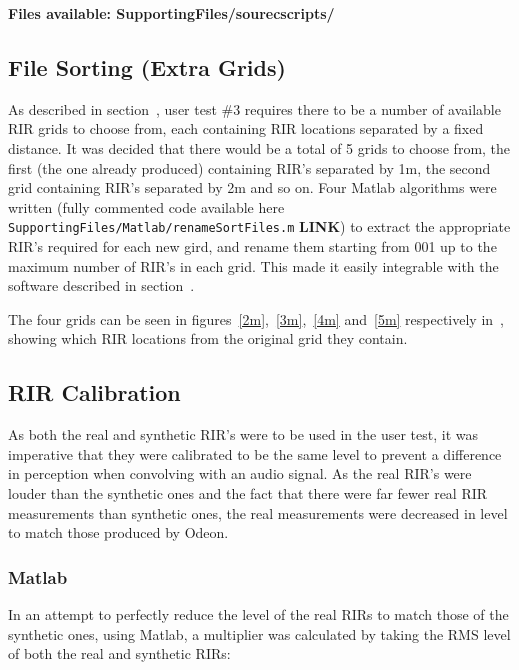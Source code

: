 \documentclass[../../main.tex]{subfiles}
\begin{document}
			\textbf{Files available: SupportingFiles/sourecscripts/}

	\subsection{File Sorting (Extra Grids)}
	\label{odeon:grids}
		As described in section~, user test \#3 requires there to be a number of available \ac{RIR} grids to choose from, each containing \ac{RIR} locations separated by a fixed distance. It was decided that there would be a total of 5 grids to choose from, the first (the one already produced) containing \ac{RIR}'s separated by 1m, the second grid containing \ac{RIR}'s separated by 2m and so on.	 Four Matlab algorithms were written (fully commented code available here \texttt{SupportingFiles/Matlab/renameSortFiles.m} \textbf{LINK}) to extract the appropriate \ac{RIR}'s required for each new gird, and rename them starting from 001 up to the maximum number of \ac{RIR}'s in each grid. This made it easily  integrable with the software described in section~.

		The four grids can be seen in figures~\ref{2m},~\ref{3m},~\ref{4m} and~\ref{5m} respectively in~, showing which \ac{RIR} locations from the original grid they contain.


	\subsection{RIR Calibration}
		
		As both the real and synthetic \ac{RIR}'s were to be used in the user test, it was imperative that they were calibrated to be the same level to prevent a difference in perception when convolving with an audio signal. As the real \ac{RIR}'s were louder than the synthetic ones and the fact that there were far fewer real \ac{RIR} measurements than synthetic ones, the real measurements were decreased in level to match those produced by Odeon.

		\subsubsection{Matlab}

		In an attempt to perfectly reduce the level of the real \ac{RIRs} to match those of the synthetic ones, using Matlab, a multiplier was calculated by taking the RMS level of both the real and synthetic \ac{RIRs}:
\end{document}

